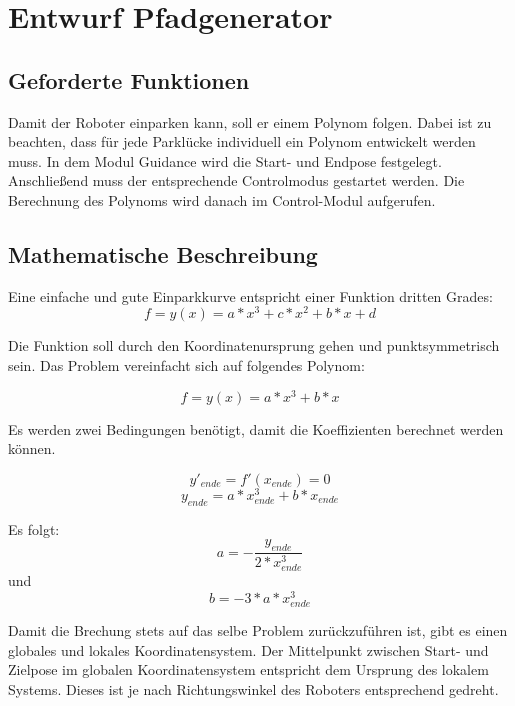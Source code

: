 \chapter{Entwurf Pfadgenerator}

\section{Geforderte Funktionen}

Damit der Roboter einparken kann, soll er einem Polynom folgen. Dabei ist zu beachten, dass für jede Parklücke individuell ein Polynom entwickelt werden muss. In dem Modul Guidance wird die Start- und Endpose festgelegt. Anschließend muss der entsprechende Controlmodus gestartet werden. Die Berechnung des Polynoms wird danach im Control-Modul aufgerufen. 


\section{Mathematische Beschreibung}

Eine einfache und gute Einparkkurve entspricht einer Funktion dritten Grades:
\begin{equation}
f=y(x)=a*x^3+c*x^2+b*x+d
\end{equation}

\noindent Die Funktion soll durch den Koordinatenursprung gehen und punktsymmetrisch sein. Das Problem vereinfacht sich auf folgendes Polynom:

\begin{equation}
f=y(x)=a*x^3+b*x
\end{equation}

\noindent Es werden zwei Bedingungen benötigt, damit die Koeffizienten berechnet werden können. 

\begin{equation}
 y'_{ende}=f'(x_{ende})=0
 \end{equation}
 \begin{equation}
y_{ende}=a*x_{ende}^3+b*x_{ende}
 \end{equation}
 
\noindent Es folgt:
 \begin{equation}
a=-\dfrac{y_{ende}}{2*x_{ende}^3}
\end{equation}
\noindent und
 \begin{equation} 
b=-3*a*x_{ende}^3
\end{equation}

\noindent Damit die Brechung stets auf das selbe Problem zurückzuführen ist, gibt es einen globales und lokales Koordinatensystem. Der Mittelpunkt zwischen Start- und Zielpose im globalen Koordinatensystem entspricht dem Ursprung des lokalem Systems. Dieses ist je nach Richtungswinkel des Roboters entsprechend gedreht.
   
